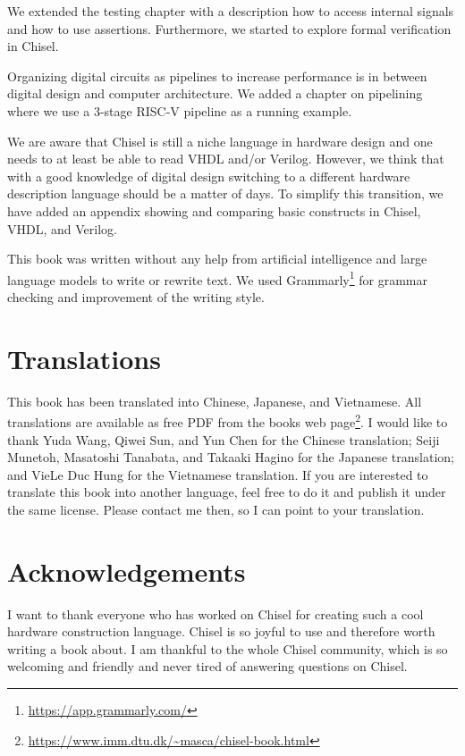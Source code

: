 \documentclass[%
    10pt,
    headinclude, footexclude,
    openright, %
    notitlepage,
    cleardoubleempty,
    headsepline,
    pointlessnumbers,
    bibtotoc, idxtotoc,
    ]{scrbook}
\newcommand{\todo}[1]{{\emph{TODO: #1}}}
\newcommand{\myref}[2]{\href{#1}{#2}}
\renewcommand{\myref}[2]{{#2}{\footnote{\url{#1}}}}
\renewcommand{\todo}[1]{}
\begin{document}
\todo{Some of this might go into getting started.}


\todo{We should also show more Leros code.}

We extended the testing chapter with a description how to access internal signals and
how to use assertions. Furthermore, we started to explore formal verification in Chisel.

Organizing digital circuits as pipelines to increase performance is in between digital design
and computer architecture.
We added a chapter on pipelining where we use a 3-stage RISC-V pipeline as a running example.

We are aware that Chisel is still a niche language in hardware design and one needs to
at least be able to read VHDL and/or Verilog. However, we think that with a good knowledge
of digital design switching to a different hardware description language should be a matter of days.
To simplify this transition, we have added an appendix showing and comparing basic constructs
in Chisel, VHDL, and Verilog.

This book was written without any help from artificial intelligence and large language models
to write or rewrite text. We used Grammarly\footnote{\url{https://app.grammarly.com/}}
for grammar checking and improvement of the writing style.


\section*{Translations}

This book has been translated into Chinese, Japanese, and Vietnamese. All translations are available as free PDF
from the books \myref{https://www.imm.dtu.dk/~masca/chisel-book.html}{web page}.
I would like to thank Yuda Wang, Qiwei Sun, and Yun Chen for the Chinese translation;
Seiji Munetoh, Masatoshi Tanabata, and Takaaki Hagino for the Japanese translation;
and VieLe Duc Hung for the Vietnamese translation.
If you are interested to translate this book into another language, feel free to do it and
publish it under the same license. Please contact me then, so I can point to your translation.


\section*{Acknowledgements}

I want to thank everyone who has worked on Chisel for creating such
a cool hardware construction language. Chisel is so joyful to use and
therefore worth writing a book about.
I am thankful to the whole Chisel community, which is so welcoming and friendly
and never tired of answering questions on Chisel.
\end{document}
